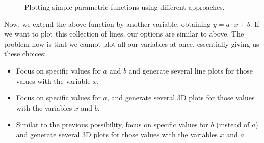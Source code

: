 \documentclass{article}
\begin{document}
\begin{figure}[ht]
  \centering
  \caption{Plotting simple parametric functions using different approaches.}
  \label{fig:simple-parametric-functions}
\end{figure}

Now, we extend the above function by another variable, obtaining $y = a \cdot x + b$.
If we want to plot this collection of lines, our options are similar to above.
The problem now is that we cannot plot all our variables at once, essentially giving us these choices:

\begin{itemize}
\item Focus on specific values for $a$ and $b$ and generate several line plots for those values with the variable $x$.
\item Focus on specific values for $a$, and generate several 3D plots for those values with the variables $x$ and $b$.
\item Similar to the previous possibility, focus on specific values for $b$ (instead of $a$) and generate several 3D plots for those values with the variables $x$ and $a$.
\end{itemize}
\end{document}
